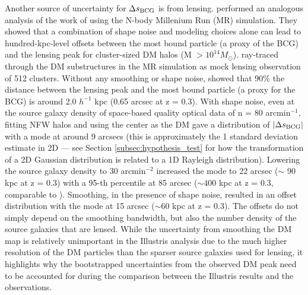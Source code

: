Another source of uncertainty for $\Delta s_{\rm BCG}$ is from lensing. 
\cite{Dietrich2012} performed an analogous analysis of the work of \cite{Oguri2010} 
using the N-body Millenium Run (MR) simulation.
They showed that a combination of shape noise and modeling choices 
alone can lead to hundred-kpc-level offsets between the most bound particle 
(a proxy of the BCG) and the lensing peak for cluster-sized DM halos 
(M $> 10^{14 }M_\odot$).  
\cite{Dietrich2012} ray-traced through the DM substructures in the MR simulation 
as mock lensing observation of 512 clusters.  
Without any smoothing or shape noise, \cite{Dietrich2012} showed 
that 90\% the distance between the lensing peak and the 
most bound particle (a proxy for the BCG) is around 2.0 $h^{-1}$ kpc
(0.65 arcsec at z = 0.3). 
With shape noise,
even at the source galaxy density of space-based quality optical data of n = 80
arcmin$^{-1}$, fitting NFW halos and using the center as the DM gave a 
distribution of $|\Delta s_{\rm BCG}|$ with a mode at around 9 arcsecs (this is
approximately the 1 standard deviation estimate in 2D --- see Section
\ref{subsec:hypothesis_test} for how the transformation of a 2D Gaussian
distribution is related to a 1D Rayleigh distribution). 
Lowering the source galaxy density to 30 arcmin$^{-2}$ increased the mode
to 22 arcsec ($\sim$ 90 kpc at z = 0.3) with a 95-th percentile at 85 arcsec 
($\sim 400$ kpc at z = 0.3, comparable to \citealt{Oguri2010}). 
Smoothing, in the presence of shape noise,
resulted in an offset distribution with the mode at
15 arcsec ($\sim 60$ kpc at z = 0.3). 
The offsets do not simply depend on the smoothing bandwidth, 
but also the number density of the source galaxies that are lensed. 
While the uncertainty from smoothing the DM map is
relatively unimportant in the Illustris analysis due to the much higher resolution 
of the DM particles than the sparser source galaxies used for lensing, it
highlights why the bootstrapped uncertainties from the observed
DM peak need to be accounted for during the comparison between the
Illustris results and the observations.


